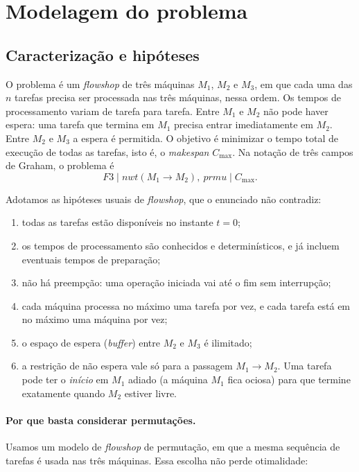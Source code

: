 \documentclass[11pt,a4paper]{article}
\begin{document}
\section{Modelagem do problema}

\subsection{Caracterização e hipóteses}

O problema é um \emph{flowshop} de três máquinas $M_1$, $M_2$ e $M_3$, em que
cada uma das $n$ tarefas precisa ser processada nas três máquinas, nessa ordem.
Os tempos de processamento variam de tarefa para tarefa. Entre $M_1$ e $M_2$ não
pode haver espera: uma tarefa que termina em $M_1$ precisa entrar imediatamente
em $M_2$. Entre $M_2$ e $M_3$ a espera é permitida. O objetivo é minimizar o
tempo total de execução de todas as tarefas, isto é, o \emph{makespan}
$C_{\max}$. Na notação de três campos de Graham, o problema é
\[
  F3 \mid \mathit{nwt}(M_1 \to M_2),\ \mathit{prmu} \mid C_{\max}.
\]

Adotamos as hipóteses usuais de \emph{flowshop}, que o enunciado não contradiz:
\begin{enumerate}
  \item todas as tarefas estão disponíveis no instante $t=0$;
  \item os tempos de processamento são conhecidos e determinísticos, e já incluem
        eventuais tempos de preparação;
  \item não há preempção: uma operação iniciada vai até o fim sem interrupção;
  \item cada máquina processa no máximo uma tarefa por vez, e cada tarefa está em
        no máximo uma máquina por vez;
  \item o espaço de espera (\emph{buffer}) entre $M_2$ e $M_3$ é ilimitado;
  \item a restrição de não espera vale só para a passagem $M_1 \to M_2$. Uma
        tarefa pode ter o \emph{início} em $M_1$ adiado (a máquina $M_1$ fica
        ociosa) para que termine exatamente quando $M_2$ estiver livre.
\end{enumerate}

\paragraph{Por que basta considerar permutações.}
Usamos um modelo de \emph{flowshop} de permutação, em que a mesma sequência de
tarefas é usada nas três máquinas. Essa escolha não perde otimalidade:
\end{document}
